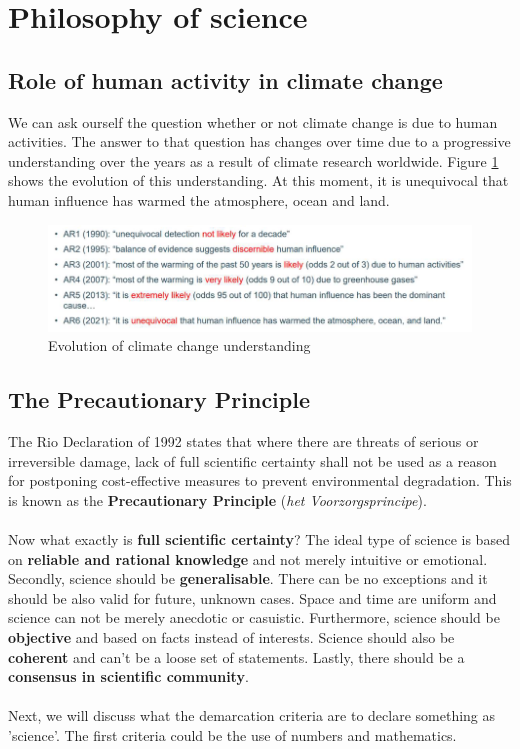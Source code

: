 \documentclass[../summary.tex]{subfiles}
\begin{document}
	
	\section{Philosophy of science}
	
	\subsection{Role of human activity in climate change}
	
	We can ask ourself the question whether or not climate change is due to human activities. The answer to that question has changes over time due to a progressive understanding over the years as a result of climate research worldwide. Figure \ref{fig:progressive-understanding-climate-change} shows the evolution of this understanding. At this moment, it is unequivocal that human influence has warmed the atmosphere, ocean and land. 
	
	\begin{figure} [htbp]
		\centering
		\includegraphics[width=1\linewidth]{images/progressive-understanding-climate-change.png}
		\caption{Evolution of climate change understanding}
		\label{fig:progressive-understanding-climate-change}
	\end{figure}
	
	\subsection{The Precautionary Principle}
	
	The Rio Declaration of 1992 states that where there are threats of serious or irreversible damage, lack of full scientific certainty shall not be used as a reason for postponing cost-effective measures to prevent environmental degradation. This is known as the \textbf{Precautionary Principle} (\textit{het Voorzorgsprincipe}).
	\\\\
	Now what exactly is \textbf{full scientific certainty}? The ideal type of science is based on \textbf{reliable and rational knowledge} and not merely intuitive or emotional. Secondly, science should be \textbf{generalisable}. There can be no exceptions and it should be also valid for future, unknown cases. Space and time are uniform and science can not be merely anecdotic or casuistic. Furthermore, science should be \textbf{objective} and based on facts instead of interests. Science should also be \textbf{coherent} and can't be a loose set of statements. Lastly, there should be a \textbf{consensus in scientific community}. 
	\\\\
	Next, we will discuss what the demarcation criteria are to declare something as 'science'. The first criteria could be the use of numbers and mathematics. 
	
\end{document}
